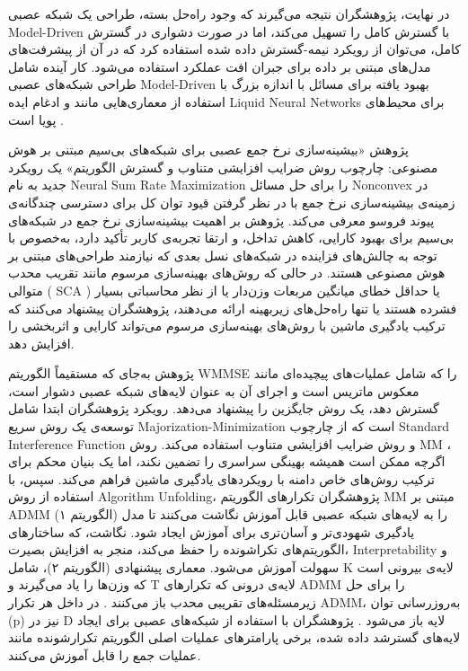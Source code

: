 در نهایت، پژوهشگران نتیجه می‌گیرند که وجود راه‌حل بسته، طراحی یک شبکه عصبی 
\gls{Model-Driven}
با گسترش کامل را تسهیل می‌کند، اما در صورت دشواری در گسترش کامل، می‌توان از رویکرد نیمه-گسترش داده شده استفاده کرد که در آن از پیشرفت‌های مدل‌های مبتنی بر داده برای جبران افت عملکرد استفاده می‌شود. کار آینده شامل طراحی شبکه‌های عصبی 
\gls{Model-Driven}
 بهبود یافته برای مسائل با اندازه بزرگ با استفاده از معماری‌هایی مانند
   و ادغام ایده 
\gls{Liquid Neural Networks}
    برای محیط‌های پویا است
\cite{OptimizingWireless}.

پژوهش «بیشینه‌سازی نرخ جمع عصبی برای شبکه‌های بی‌سیم مبتنی بر هوش مصنوعی: چارچوب روش ضرایب افزایشی متناوب و گسترش الگوریتم» یک رویکرد جدید به نام 
\gls{Neural Sum Rate Maximization}
 را برای حل مسائل
\gls{Nonconvex}
  در زمینه‌ی بیشینه‌سازی نرخ جمع با در نظر گرفتن قیود توان کل برای دسترسی چندگانه‌ی پیوند فروسو معرفی می‌کند.
 پژوهش بر اهمیت بیشینه‌سازی نرخ جمع در شبکه‌های بی‌سیم برای بهبود کارایی، کاهش تداخل، و ارتقا تجربه‌ی کاربر تأکید دارد، به‌خصوص با توجه به چالش‌های فزاینده در شبکه‌های نسل بعدی که نیازمند طراحی‌های مبتنی بر هوش مصنوعی هستند. در حالی که روش‌های بهینه‌سازی مرسوم مانند تقریب محدب متوالی (
\gls{SCA}
 ) یا حداقل خطای میانگین مربعات وزن‌دار یا از نظر محاسباتی بسیار فشرده هستند یا تنها راه‌حل‌های زیربهینه ارائه می‌دهند، پژوهشگران پیشنهاد می‌کنند که ترکیب یادگیری ماشین با روش‌های بهینه‌سازی مرسوم می‌تواند کارایی و اثربخشی را افزایش دهد.

 پژوهش به‌جای که مستقیماً الگوریتم 
\gls{WMMSE}
  را که شامل عملیات‌های پیچیده‌ای مانند معکوس ماتریس است و اجرای آن به عنوان لایه‌های شبکه عصبی دشوار است، گسترش دهد، یک روش جایگزین را پیشنهاد می‌دهد. رویکرد پژوهشگران ابتدا شامل توسعه‌ی یک روش سریع
\gls{Majorization-Minimization}
   است که از چارچوب  
\gls{Standard Interference Function}
    و روش ضرایب افزایشی متناوب استفاده می‌کند.  روش 
\gls{MM}
    ، اگرچه ممکن است همیشه بهینگی سراسری را تضمین نکند، اما یک بنیان محکم برای ترکیب روش‌های خاص دامنه با رویکردهای یادگیری ماشین فراهم می‌کند.
سپس، با استفاده از روش 
\gls{Algorithm Unfolding}،
 پژوهشگران تکرارهای الگوریتم 
\gls{MM}
  مبتنی بر 
\gls{ADMM}
 (الگوریتم ۱) را به لایه‌های شبکه عصبی قابل آموزش نگاشت می‌کنند تا مدل یادگیری شهودی‌تر و آسان‌تری برای آموزش ایجاد شود.  نگاشت، که ساختارهای الگوریتم‌های تکراشونده را حفظ می‌کند، منجر به افزایش بصیرت، 
\gls{Interpretability}
 و سهولت آموزش می‌شود. معماری پیشنهادی (الگوریتم ۲)، شامل K لایه‌ی بیرونی است که وزن‌ها را یاد می‌گیرند و T لایه‌ی درونی که تکرارهای 
\gls{ADMM}
  را برای حل زیرمسئله‌های تقریبی محدب باز می‌کنند . در داخل هر تکرار
\gls{ADMM}،
  به‌روزرسانی توان (p) نیز در D لایه باز می‌شود . پژوهشگران با استفاده از شبکه‌های عصبی برای ایجاد لایه‌های گسترشد داده شده، برخی پارامترهای عملیات اصلی الگوریتم تکرارشونده مانند عملیات جمع را قابل آموزش می‌کنند.
  
